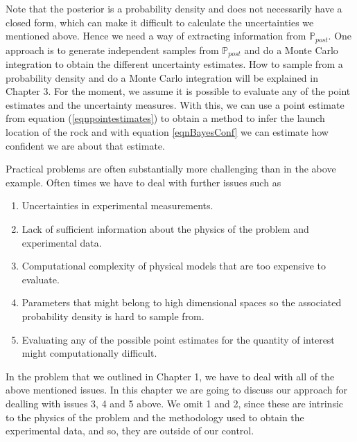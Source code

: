 \documentclass{sfuthesis}
\newcommand{\post}{\mathbb{P}_{post}}
\begin{document}
Note that the posterior is a probability density and  does not necessarily have a closed form, which
can make it difficult to calculate the uncertainties we mentioned above.
Hence we need a way of extracting information from $\post$. One approach is to generate 
independent samples
from $\post$ and do a Monte Carlo integration   to obtain the different uncertainty estimates. 
How to sample from a probability 
density and do a Monte Carlo integration will be explained in Chapter 3. For the moment, we
assume it is possible to evaluate any of the point estimates and the uncertainty measures. With 
this, we can use a point estimate from equation (\ref{eqnpointestimates}) to obtain a method to infer 
the launch location of the rock and with equation \eqref{eqnBayesConf} we can estimate how confident we are
about that estimate. 
\newline


Practical problems are often substantially more challenging than in the above example. Often times we have to 
deal with further issues such as 

\begin{enumerate}
\item Uncertainties in experimental measurements.
\item Lack of sufficient information about the physics of the problem and experimental data.
\item Computational complexity of  physical models that are too expensive to evaluate.
\item Parameters that might belong to high dimensional spaces so the associated probability density is 
hard to sample from.
\item Evaluating any of the possible point estimates for the quantity of interest might computationally difficult.
\end{enumerate}
In the problem that we outlined in  Chapter 1, we have to deal with all of  the above mentioned issues.
In this chapter we are going to discuss our approach for dealling with issues 3, 4 and 5 above. We 
omit 1 and 2, since these  are intrinsic to the physics of the problem and   the methodology used 
to obtain the experimental data, and so, they are outside of our control.


\end{document}
